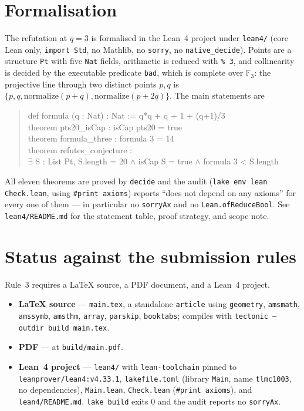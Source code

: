 \documentclass[11pt]{article}
\theoremstyle{definition}
\theoremstyle{remark}
\newcommand{\F}{\mathbb{F}}
\begin{document}
\section{Formalisation}

The refutation at $q=3$ is formalised in the Lean~4 project under
\texttt{lean4/} (core Lean only, \texttt{import Std}, no Mathlib, no
\texttt{sorry}, no \texttt{native\_decide}). Points are a structure
\texttt{Pt} with five \texttt{Nat} fields, arithmetic is reduced with
\texttt{\% 3}, and collinearity is decided by the executable predicate
\texttt{bad}, which is complete over $\F_{3}$: the projective line through two
distinct points $p,q$ is $\{p,q,\text{normalize}(p+q),\text{normalize}(p+2q)\}$.
The main statements are

\begin{quote}\ttfamily
def formula (q : Nat) : Nat := q*q + q + 1 + (q+1)/3\\
theorem pts20\_isCap : isCap pts20 = true\\
theorem formula\_three : formula 3 = 14\\
theorem refutes\_conjecture :\\
\hspace*{2em}$\exists$ S : List Pt, S.length = 20 $\wedge$ isCap S = true
  $\wedge$ formula 3 < S.length
\end{quote}

All eleven theorems are proved by \texttt{decide} and the audit
(\texttt{lake env lean Check.lean}, using \texttt{\#print axioms}) reports
``does not depend on any axioms'' for every one of them --- in particular no
\texttt{sorryAx} and no \texttt{Lean.ofReduceBool}. See
\texttt{lean4/README.md} for the statement table, proof strategy, and scope
note.

\section*{Status against the submission rules}

Rule~3 requires a LaTeX source, a PDF document, and a Lean~4 project.

\begin{itemize}
\item \textbf{LaTeX source} --- \texttt{main.tex}, a standalone \texttt{article}
  using \texttt{geometry}, \texttt{amsmath}, \texttt{amssymb}, \texttt{amsthm},
  \texttt{array}, \texttt{parskip}, \texttt{booktabs}; compiles with
  \texttt{tectonic --outdir build main.tex}.
\item \textbf{PDF} --- at \texttt{build/main.pdf}.
\item \textbf{Lean~4 project} --- \texttt{lean4/} with \texttt{lean-toolchain}
  pinned to \texttt{leanprover/lean4:v4.33.1}, \texttt{lakefile.toml} (library
  \texttt{Main}, name \texttt{tlmc1003}, no dependencies), \texttt{Main.lean},
  \texttt{Check.lean} (\texttt{\#print axioms}), and \texttt{lean4/README.md}.
  \texttt{lake build} exits $0$ and the audit reports no \texttt{sorryAx}.
\end{itemize}
\end{document}
